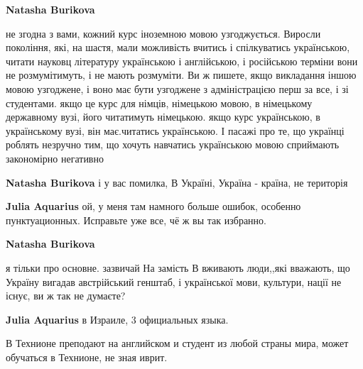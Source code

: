 \begin{itemize}
\begin{itemize}
\textbf{Natasha Burikova} 

не згодна з вами, кожний курс іноземною мовою узгоджується. Виросли покоління,
які, на шастя, мали можливість вчитись і спілкуватись українською, читати
науковц літературу українською і англійською, і російською терміни вони не
розмумітимуть, і не мають розмуміти. Ви ж пишете, якщо викладання іншою мовою
узгоджене, і воно має бути узгоджене з адміністрацією перш за все, і зі
студентами. якщо це курс для німців, німецькою мовою, в німецькому державному
вузі, його читатимуть німецькою. якщо курс українською, в українському вузі,
він має.читатись українською. І пасажі про те, що українці роблять незручно
тим, що хочуть навчатись українською мовою сприймають закономірно негативно


 
\textbf{Natasha Burikova} і у вас помилка, В Україні, Україна - країна, не територія

 
\textbf{Julia Aquarius} ой, у меня там намного больше ошибок, особенно пунктуационных. Исправьте уже все, чё ж вы так избранно.

 
\textbf{Natasha Burikova} 

я тільки про основне. зазвичай На замість В вживають люди,,які вважають, що
Україну вигадав австрійський генштаб, і української мови, культури, нації не
існує, ви ж так не думаєте?

 
\textbf{Julia Aquarius} в Израиле, 3 официальных языка.

В Технионе преподают на английском и студент из любой страны мира, может обучаться в Технионе, не зная иврит.


\end{itemize}
\end{itemize}
